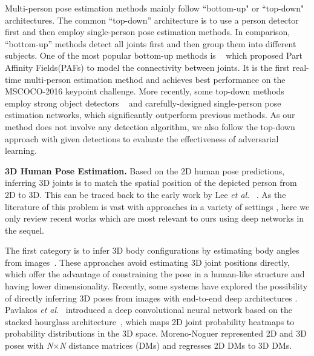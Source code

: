 \documentclass[10pt,journal,compsoc]{IEEEtran}
\begin{document}
Multi-person pose estimation methods mainly follow ``bottom-up" or ``top-down" architectures. The common ``top-down'' architecture \cite{gkioxari2014using,pishchulin2012articulated,sun2011articulated,huang2017coarse,he2017mask} is to use a person detector first and then employ single-person pose estimation methods. In comparison, ``bottom-up'' methods detect all joints first and then group them into different subjects. One of the most popular bottom-up methods is ~\cite{cao2017realtime} which proposed Part Affinity Fields(PAFs) to model the connectivity between joints. It is the first real-time multi-person estimation method and achieves best performance on the MSCOCO-2016 keypoint challenge. More recently, some top-down methods ~\cite{fang2017rmpe,chen2017cascaded} employ strong object detectors ~\cite{ren2015faster} and carefully-designed single-person pose estimation networks, which significantly outperform previous methods.
As our method does  not    involve any detection algorithm, we also follow the top-down
 approach with given detections to evaluate the effectiveness of adversarial learning.





{\bf 3D Human Pose Estimation.}
Based on the 2D human pose predictions, inferring 3D joints is to match the spatial position of the depicted person from 2D to 3D.
This can be traced back to the early work by Lee \emph{et al}. ~\cite{lee1985determination}.
As the literature of this problem is vast with approaches in a variety of settings \cite{scott1999factors}, here
we only review recent works which are most relevant to ours using deep networks in the sequel.

The first category is to infer 3D body configurations by estimating body angles from images~\cite{zhou2016deep,bogo2016keep}.
These approaches avoid estimating 3D joint positions directly, which offer the advantage of constraining the pose in a human-like structure and having lower dimensionality.
Recently, some systems have explored the possibility of directly inferring 3D poses from images with end-to-end deep architectures \cite{tekin2016structured}.
Pavlakos \emph{et al}.~\cite{pavlakos2016coarse} introduced a deep convolutional neural network
based on the stacked hourglass architecture~\cite{conf/eccv/NewellYD16}, which maps 2D joint probability heatmaps to probability distributions in the 3D space.
Moreno-Noguer \cite{moreno20163d} represented 2D and 3D poses with \textit{N}$\times$\textit{N} distance matrices (DMs)
and regresses 2D DMs to 3D DMs.
\end{document}
